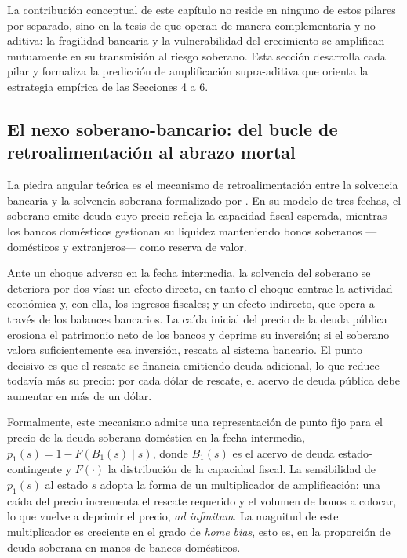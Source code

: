 La contribución conceptual de este capítulo no reside en ninguno de estos pilares por separado, sino en la tesis de que operan de manera complementaria y no aditiva: la fragilidad bancaria y la vulnerabilidad del crecimiento se amplifican mutuamente en su transmisión al riesgo soberano. Esta sección desarrolla cada pilar y formaliza la predicción de amplificación supra-aditiva que orienta la estrategia empírica de las Secciones 4 a 6.

\subsection{El nexo soberano-bancario: del bucle de retroalimentación al abrazo mortal}

La piedra angular teórica es el mecanismo de retroalimentación entre la solvencia bancaria y la solvencia soberana formalizado por \citet{FarhiTirole2018b}. En su modelo de tres fechas, el soberano emite deuda cuyo precio refleja la capacidad fiscal esperada, mientras los bancos domésticos gestionan su liquidez manteniendo bonos soberanos —domésticos y extranjeros— como reserva de valor.

Ante un choque adverso en la fecha intermedia, la solvencia del soberano se deteriora por dos vías: un efecto directo, en tanto el choque contrae la actividad económica y, con ella, los ingresos fiscales; y un efecto indirecto, que opera a través de los balances bancarios. La caída inicial del precio de la deuda pública erosiona el patrimonio neto de los bancos y deprime su inversión; si el soberano valora suficientemente esa inversión, rescata al sistema bancario. El punto decisivo es que el rescate se financia emitiendo deuda adicional, lo que reduce todavía más su precio: por cada dólar de rescate, el acervo de deuda pública debe aumentar en más de un dólar.

Formalmente, este mecanismo admite una representación de punto fijo para el precio de la deuda soberana doméstica en la fecha intermedia, $p_1(s) = 1 - F\!\left(B_1(s)\mid s\right)$, donde $B_1(s)$ es el acervo de deuda estado-contingente y $F(\cdot)$ la distribución de la capacidad fiscal. La sensibilidad de $p_1(s)$ al estado $s$ adopta la forma de un multiplicador de amplificación: una caída del precio incrementa el rescate requerido y el volumen de bonos a colocar, lo que vuelve a deprimir el precio, \textit{ad infinitum}. La magnitud de este multiplicador es creciente en el grado de \textit{home bias}, esto es, en la proporción de deuda soberana en manos de bancos domésticos.

